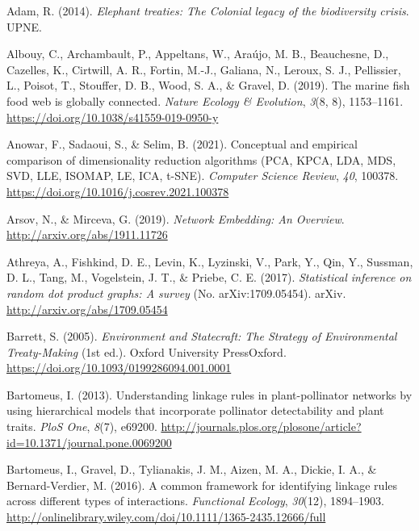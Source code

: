 \documentclass[11pt]{article}
\newlength{\cslhangindent}
\newenvironment{CSLReferences}[2] %
 {%
  \setlength{\parindent}{0pt}
  \ifodd #1 \everypar{\setlength{\hangindent}{\cslhangindent}}\ignorespaces\fi
  \ifnum #2 > 0
  \setlength{\parskip}{#2\baselineskip}
  \fi
 }%
 {}
\begin{document}
\hypertarget{refs}{}
\begin{CSLReferences}{1}{0}
\leavevmode{}%
Adam, R. (2014). \emph{Elephant treaties: The Colonial legacy of the
biodiversity crisis}. UPNE.

\leavevmode{}%
Albouy, C., Archambault, P., Appeltans, W., Araújo, M. B., Beauchesne,
D., Cazelles, K., Cirtwill, A. R., Fortin, M.-J., Galiana, N., Leroux,
S. J., Pellissier, L., Poisot, T., Stouffer, D. B., Wood, S. A., \&
Gravel, D. (2019). The marine fish food web is globally connected.
\emph{Nature Ecology \& Evolution}, \emph{3}(8, 8), 1153--1161.
\url{https://doi.org/10.1038/s41559-019-0950-y}

\leavevmode{}%
Anowar, F., Sadaoui, S., \& Selim, B. (2021). Conceptual and empirical
comparison of dimensionality reduction algorithms (PCA, KPCA, LDA, MDS,
SVD, LLE, ISOMAP, LE, ICA, t-SNE). \emph{Computer Science Review},
\emph{40}, 100378. \url{https://doi.org/10.1016/j.cosrev.2021.100378}

\leavevmode{}%
Arsov, N., \& Mirceva, G. (2019). \emph{Network Embedding: An Overview}.
\url{http://arxiv.org/abs/1911.11726}

\leavevmode{}%
Athreya, A., Fishkind, D. E., Levin, K., Lyzinski, V., Park, Y., Qin,
Y., Sussman, D. L., Tang, M., Vogelstein, J. T., \& Priebe, C. E.
(2017). \emph{Statistical inference on random dot product graphs: A
survey} (No. arXiv:1709.05454). arXiv.
\url{http://arxiv.org/abs/1709.05454}

\leavevmode{}%
Barrett, S. (2005). \emph{Environment and Statecraft: The Strategy of
Environmental Treaty-Making} (1st ed.). Oxford University PressOxford.
\url{https://doi.org/10.1093/0199286094.001.0001}

\leavevmode{}%
Bartomeus, I. (2013). Understanding linkage rules in plant-pollinator
networks by using hierarchical models that incorporate pollinator
detectability and plant traits. \emph{PloS One}, \emph{8}(7), e69200.
\url{http://journals.plos.org/plosone/article?id=10.1371/journal.pone.0069200}

\leavevmode{}%
Bartomeus, I., Gravel, D., Tylianakis, J. M., Aizen, M. A., Dickie, I.
A., \& Bernard-Verdier, M. (2016). A common framework for identifying
linkage rules across different types of interactions. \emph{Functional
Ecology}, \emph{30}(12), 1894--1903.
\url{http://onlinelibrary.wiley.com/doi/10.1111/1365-2435.12666/full}


\end{CSLReferences}
\end{document}
